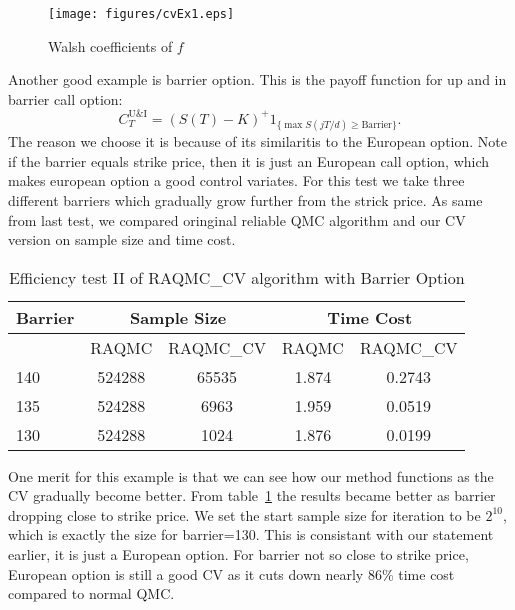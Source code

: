 \begin{figure}[h]
    \centering
    \texttt{[image: figures/cvEx1.eps]}
    \label{fg:cvEX1}
    \caption{Walsh coefficients of $f$}
\end{figure}
\fi
{}
Another good example is barrier option. This is the payoff function for up and in barrier call option:
\[ C_{T}^{\mathrm{U\&I}} = (S(T)-K)^+1_{ \{\max{S(jT/d)}\geq \mathrm{Barrier}\}}.\]
The reason we choose it is because of its similaritis to the European option. 
Note if the barrier equals strike price, then it is just an European call option, which makes european option a good control variates. 
For this test we take three different barriers which gradually grow further from the strick price. 
As same from last test, we compared oringinal reliable QMC algorithm and our CV version on sample size and time cost. 
\begin{table}[h]
    \centering
    \label{tb:efftest2b}
	\caption{Efficiency test II of RAQMC\_CV algorithm with Barrier Option}
    \begin{tabular}{lcccc}
    \hline\hline
	Barrier &\multicolumn{2}{c}{Sample Size}
		&\multicolumn{2}{c}{Time Cost} \\
    \hline
	&RAQMC&RAQMC\_CV
    &RAQMC&RAQMC\_CV\\[0.5ex]
    \hline
	140  & 524288& 65535
	     & 1.874&0.2743 \\ 
	135  & 524288&6963
	     & 1.959&0.0519 \\ 
	130  & 524288&1024
    & 1.876& 0.0199 \\[1ex]
    \hline
	\end{tabular}
\end{table}
One merit for this example is that we can see how our method functions as the CV gradually become better. 
From table~\ref{tb:efftest2b} the results became better as barrier dropping close to strike price. 
We set the start sample size for iteration to be $2^{10}$, which is exactly the size for barrier=130. 
This is consistant with our statement earlier, it is just a European option. 
For barrier not so close to strike price, European option is still a good CV as it cuts down nearly 86\% time cost compared to normal QMC.
